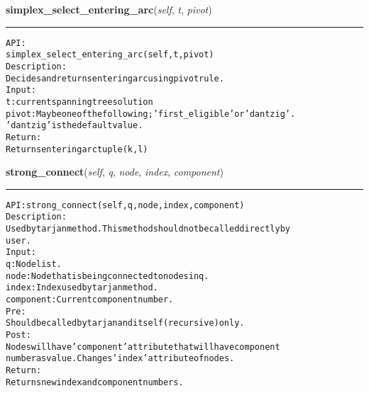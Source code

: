 \hspace{.8\funcindent}\begin{boxedminipage}{\funcwidth}

    \raggedright \textbf{simplex\_select\_entering\_arc}(\textit{self}, \textit{t}, \textit{pivot})

    \vspace{-1.5ex}

    \rule{\textwidth}{0.5\fboxrule}
\setlength{\parskip}{2ex}
\begin{alltt}

API:
    simplex\_select\_entering\_arc(self, t, pivot)
Description:
    Decides and returns entering arc using pivot rule.
Input:
    t: current spanning tree solution
    pivot: May be one of the following; 'first\_eligible' or 'dantzig'.
    'dantzig' is the default value.
Return:
    Returns entering arc tuple (k,l)
\end{alltt}

\setlength{\parskip}{1ex}
    \end{boxedminipage}

    \label{coinor:gimpy:graph:Graph:strong_connect}

    \vspace{0.5ex}

\hspace{.8\funcindent}\begin{boxedminipage}{\funcwidth}

    \raggedright \textbf{strong\_connect}(\textit{self}, \textit{q}, \textit{node}, \textit{index}, \textit{component})

    \vspace{-1.5ex}

    \rule{\textwidth}{0.5\fboxrule}
\setlength{\parskip}{2ex}
\begin{alltt}

API: strong\_connect (self, q, node, index, component)
Description:
Used by tarjan method. This method should not be called directly by
user.
Input:
    q: Node list.
    node: Node that is being connected to nodes in q.
    index: Index used by tarjan method.
    component: Current component number.
Pre:
    Should be called by tarjan and itself (recursive) only.
Post:
    Nodes will have 'component' attribute that will have component
    number as value. Changes 'index' attribute of nodes.
Return:
    Returns new index and component numbers.
\end{alltt}

\setlength{\parskip}{1ex}
    \end{boxedminipage}

